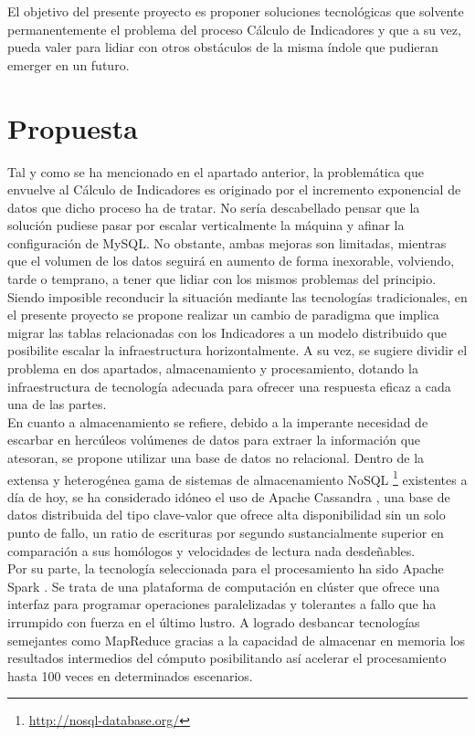 El objetivo del presente proyecto es proponer soluciones tecnológicas que solvente permanentemente el problema del proceso Cálculo de Indicadores y que a su vez, pueda valer para lidiar con otros obstáculos de la misma índole que pudieran emerger en un futuro.\\

\section{Propuesta}

Tal y como se ha mencionado en el apartado anterior, la problemática que envuelve al Cálculo de Indicadores es originado por el incremento exponencial de datos que dicho proceso ha de tratar. No sería descabellado pensar que la solución pudiese pasar por escalar verticalmente la máquina y afinar la configuración de MySQL. No obstante, ambas mejoras son limitadas, mientras que el volumen de los datos seguirá en aumento de forma inexorable, volviendo, tarde o temprano, a tener que lidiar con los mismos problemas del principio.\\

Siendo imposible reconducir la situación mediante las tecnologías tradicionales, en el presente proyecto se propone realizar un cambio de paradigma que implica migrar las tablas relacionadas con los Indicadores a un modelo distribuido que posibilite escalar la infraestructura horizontalmente. A su vez, se sugiere dividir el problema en dos apartados, almacenamiento y procesamiento, dotando la infraestructura de tecnología adecuada para ofrecer una respuesta eficaz a cada una de las partes.\\

En cuanto a almacenamiento se refiere, debido a la imperante necesidad de escarbar en hercúleos volúmenes de datos para extraer la información que atesoran, se propone utilizar una base de datos no relacional. Dentro de la extensa y heterogénea gama de sistemas de almacenamiento NoSQL \footnote{\url{http://nosql-database.org/}} existentes a día de hoy, se ha considerado idóneo el uso de Apache Cassandra \cite{lakshman2010cassandra}, una base de datos distribuida del tipo clave-valor que ofrece alta disponibilidad sin un solo punto de fallo, un ratio de escrituras por segundo sustancialmente superior en comparación a sus homólogos \cite{rabl2012solving} y velocidades de lectura nada desdeñables.\\

Por su parte, la tecnología seleccionada para el procesamiento ha sido Apache Spark \cite{zaharia2010spark}. Se trata de una plataforma de computación en clúster que ofrece una interfaz para programar operaciones paralelizadas y tolerantes a fallo que ha irrumpido con fuerza en el último lustro. A logrado desbancar tecnologías semejantes como MapReduce \cite{dean2008mapreduce} gracias a la capacidad de almacenar en memoria los resultados intermedios del cómputo posibilitando así acelerar el procesamiento hasta 100 veces \cite{xin2013shark} en determinados escenarios.\\

